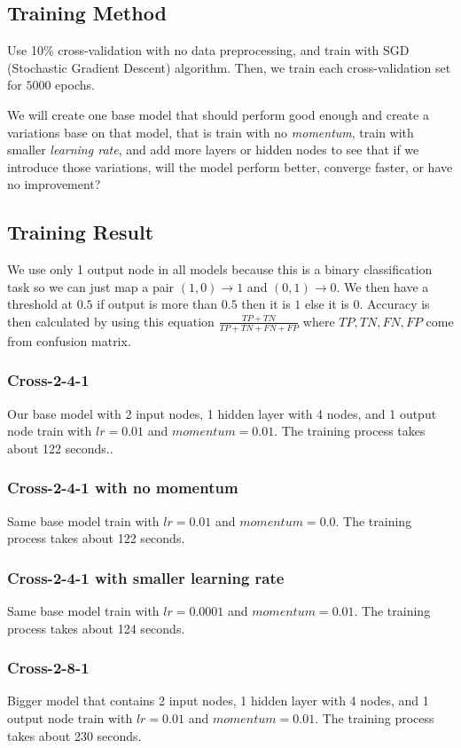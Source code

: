 \documentclass{article}
\begin{document}
\subsection*{Training Method}
Use 10\% cross-validation with no data preprocessing, and train with SGD (Stochastic Gradient Descent) algorithm. Then, we train each cross-validation set for $5000$ epochs.

We will create one base model that should perform good enough 
and create a variations base on that model, that is train 
with no \emph{momentum}, train with smaller \emph{learning rate}, 
and add more layers or hidden nodes to see that if we introduce 
those variations, will the model perform better, converge faster, or have no improvement?

\subsection*{Training Result}
We use only 1 output node in all models because this is a binary classification task so we can just map a pair $(1, 0) \rightarrow 1$ and $(0, 1) \rightarrow 0$.
We then have a threshold at $0.5$ if output is more than $0.5$ then it is $1$ else it is $0$.
Accuracy is then calculated by using this equation $\frac{TP+TN}{TP+TN+FN+FP}$ where $TP, TN, FN, FP$ come from confusion matrix.
\subsubsection*{Cross-2-4-1}
Our base model with 2 input nodes, 1 hidden layer with 4 nodes, and 1 output node train with $lr = 0.01$ and $momentum = 0.01$. 
The training process takes about 122 seconds..
\subsubsection*{Cross-2-4-1 with no momentum}
Same base model train with $lr = 0.01$ and $momentum = 0.0$.
The training process takes about 122 seconds.
\subsubsection*{Cross-2-4-1 with smaller learning rate}
Same base model train with $lr = 0.0001$ and $momentum = 0.01$.
The training process takes about 124 seconds.
\subsubsection*{Cross-2-8-1}
Bigger model that contains 2 input nodes, 1 hidden layer with 4 nodes, and 1 output node train with $lr = 0.01$ and $momentum = 0.01$.
The training process takes about 230 seconds.
\end{document}
